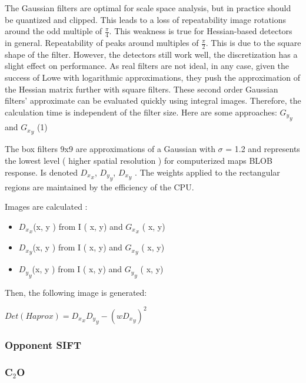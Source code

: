 \documentclass[12pt]{article}
\begin{document}
\begin{itemize}
The Gaussian filters are optimal for scale space analysis, but in practice should be quantized and clipped. This leads to a loss of repeatability image rotations around the odd multiple of $\frac{\pi}{4}$. This weakness is true for Hessian-based detectors in general. Repeatability of peaks around multiples of $\frac{\pi}{2}$. This is due to the square shape of the filter. However, the detectors still work well, the discretization has a slight effect on performance. As real filters are not ideal, in any case, given the success of Lowe with logarithmic approximations, they push the approximation of the Hessian matrix further with square filters. These second order Gaussian filters' approximate can be evaluated quickly using integral images. Therefore, the calculation time is independent of the filter size. Here are some approaches: ${G_y}_y$ and ${G_x}_y$ (1)

The box filters 9x9 are approximations of a Gaussian with $\sigma$ = 1.2 and represents the lowest level ( higher spatial resolution ) for computerized maps BLOB response. Is denoted ${D_x}_x$, ${D_y}_y$, ${D_x}_y$ . The weights applied to the rectangular regions are maintained by the efficiency of the CPU.


\begin{description}


\item Images are calculated :
\begin{itemize}
\item ${D_x}_x$(x, y ) from I ( x, y) and ${G_x}_x$ ( x, y)
\item ${D_x}_y$(x, y ) from I ( x, y) and ${G_x}_y$ ( x, y)
\item ${D_y}_y$(x, y ) from I ( x, y) and ${G_y}_y$ ( x, y)
\end{itemize}
Then, the following image is generated:

$Det(H aprox) = {D_x}_x {D_y}_y-(w{D_x}_y)^2$ 


\end{description}
	
	
	
\end{itemize}
	



\subsubsection{Opponent SIFT}

\subsubsection{C$_2$O}

\end{document}
